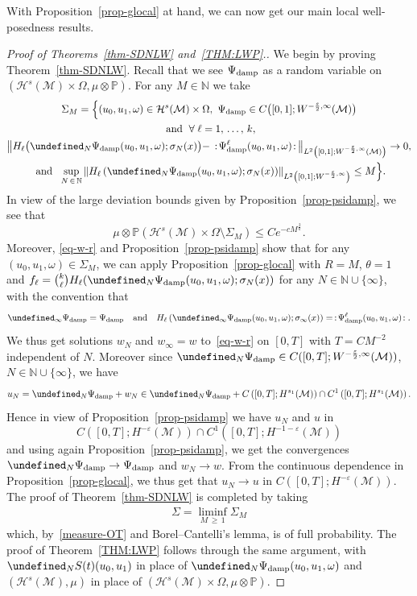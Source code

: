 \documentclass[AHL,Unicode,longabstracts,published]{cedram}
\newcommand{\damp}{\textup{damp}}
\newcommand{\Prob}{\mathbb{P}}
\newcommand{\N}{\mathbb{N}}
\let\P= \undefined
\newcommand{\P}{\mathbf{P}}
\newcommand{\M}{\mathcal{M}}
\renewcommand{\H}{\mathcal{H}}
\newcommand{\eps}{\varepsilon}
\newcommand{\s}{\sigma}
\newcommand{\Si}{\Sigma}
\renewcommand{\o}{\omega}
\renewcommand{\O}{\Omega}
\let\oldforall\forall
\renewcommand*{\forall}{\mathrel{\oldforall}}
\begin{document}
With Proposition~\ref{prop-glocal} at hand, we can now get our main local well-posedness results.
\begin{proof}[Proof of Theorems~\ref{thm-SDNLW} and~\ref{THM:LWP}.]
We begin by proving Theorem~\ref{thm-SDNLW}. Recall that we see $\Psi_{\damp}$ as a random variable on $(\H^s(\M)\times\O,\mu\otimes\Prob)$. For any $M\in\N$ we take
\begin{multline*}
\Si_{M} = \Big\{(u_0,u_1,\o)\in\H^s(\M)\times\O,~\Psi_{\damp}\in C\big([0,1];W^{-\frac\eps2,\infty}(\M)\big) \\
\text{ and }\forall \ell=1,\,\dots,\,k,\\
\left\|H_{\ell}\big(\P_N\Psi_\damp(u_0,u_1,\o);\s_N(x)\big) - \,:\!\Psi_{\damp}^{\ell}(u_0,u_1,\o)\!:\,\right\|_{L^2\left([0,1];W^{-\frac{\eps}2,\infty}(\M)\right)}\to 0,\\
\text{ and }~\sup_{N\,\in\,\N}\left\|H_{\ell}\left(\P_N\Psi_\damp(u_0,u_1,\o);\s_N(x)\right)\right\|_{L^{2}\left([0,1];W^{-\frac\eps2,\infty}\right)}\leq M\Big\}.
\end{multline*}
In view of the large deviation bounds given by Proposition~\ref{prop-psidamp}, we see that
\begin{equation}\label{measure-OT}
\mu\otimes\Prob\left(\H^s(\M)\times\O\setminus \Si_{M}\right)\leq Ce^{-cM^{\frac2k}}.
\end{equation}
Moreover, \eqref{eq-w-r} and Proposition~\ref{prop-psidamp} show that for any $(u_0,u_1,\o)\in\Si_{M}$, we can apply Proposition~\ref{prop-glocal} with $R=M$, $\theta=1$ and $f_\ell = {\binom k \ell}H_{\ell}(\P_N\Psi_\damp(u_0,u_1,\o);\s_N(x))$ for any $N\in\N\cup\{\infty\}$, with the convention that 
\[
\P_{\infty}\Psi_{\damp} = \Psi_{\damp}\quad\text{and}\quad H_{\ell}\left(\P_\infty\Psi_\damp(u_0,u_1,\o);\s_\infty(x)\right) = \,:\!\Psi_\damp^\ell(u_0,u_1,\o)\!:.
\]
We thus get solutions $w_N$ and $w_{\infty}=w$ to~\eqref{eq-w-r} on $[0,T]$ with $T = CM^{-2}$ independent of $N$. Moreover since $\P_N\Psi_{\damp}\in C([0,T];W^{-\frac\eps2,\infty}(\M))$, $N\in\N\cup\{\infty\}$, we have
\begin{align*}
u_N=\P_N\Psi_{\damp}+w_N\in \P_N\Psi_{\damp} + C\left([0,T];H^{s_1}(\M)\right)\cap C^1\left([0,T];H^{s_1}(\M)\right).
\end{align*}
Hence in view of Proposition~\ref{prop-psidamp} we have $u_N$ and $u$ in 
\[
C\left([0,T];H^{-\eps}(\M)\right)\cap C^1\left([0,T];H^{-1-\eps}(\M)\right)
\]
and using again Proposition~\ref{prop-psidamp}, we get the convergences $\P_N\Psi_{\damp}\rightarrow \Psi_{\damp}$ and $w_N\rightarrow w$. From the continuous dependence in Proposition~\ref{prop-glocal}, we thus get that $u_N \rightarrow u$ in $C([0,T];H^{-\eps}(\M))$. The proof of Theorem~\ref{thm-SDNLW} is completed by taking
\begin{align*}
\Si =\liminf_{M\,\geq\,1} \Si_{M}
\end{align*}
which, by~\eqref{measure-OT} and Borel--Cantelli's lemma, is of full probability. The proof of Theorem~\ref{THM:LWP} follows through the same argument, with $\P_NS(t)(u_0,u_1)$ in place of $\P_N\Psi_{\damp}(u_0,u_1,\o)$ and $(\H^s(\M),\mu)$ in place of $(\H^s(\M)\times\O,\mu\otimes\Prob)$.
\end{proof}
\end{document}
